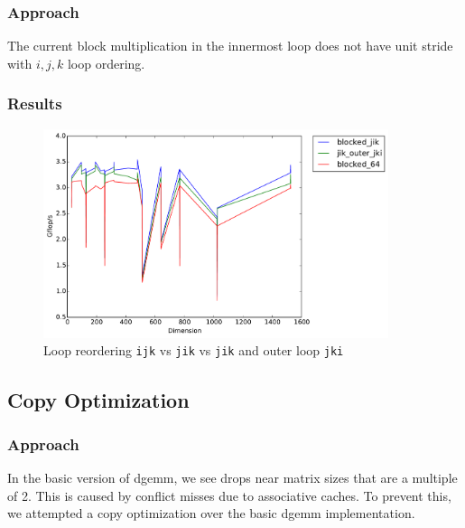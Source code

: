\documentclass[11pt]{article}
\theoremstyle{plain}
\theoremstyle{definition}
\begin{document}
\subsubsection{Approach}
The current block multiplication in the innermost loop does not have unit stride with $i, j, k$ loop ordering. 
\subsubsection{Results}

\begin{figure}[H]
    \includegraphics[width=0.9\textwidth]{timing_loop_reorder_fast.pdf}
    \caption{Loop reordering \texttt{ijk} vs \texttt{jik} vs \texttt{jik} and outer loop \texttt{jki}}
    \label{basic_copy_opt}
\end{figure} 

\subsection{Copy Optimization}
\subsubsection{Approach}
In the basic version of dgemm, we see drops near matrix sizes that are a multiple of 2. This is caused by conflict misses due to associative caches. To prevent this, we attempted a copy optimization over the basic dgemm implementation.
\end{document}
